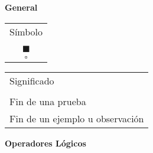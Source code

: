 \documentclass[a4,paper]{article}
\begin{document}
\begin{center}
	{\Large \bf General}
\end{center}
\begin{multicols}{2}


\begin{tabular}{c} 
	Símbolo  \\ 
	\textasteriskcentered \\
   $ \blacksquare $ \\ 

	$ \square $  \\ 
\end{tabular}  

\columnbreak

\begin{tabular}{l}
	Significado \\
	 \\
	Fin de una prueba	\\
	
	Fin de un ejemplo u observación	\\
\end{tabular}
\end{multicols}
\begin{center}
	{\Large \bf Operadores Lógicos}
\end{center}
\end{document}
